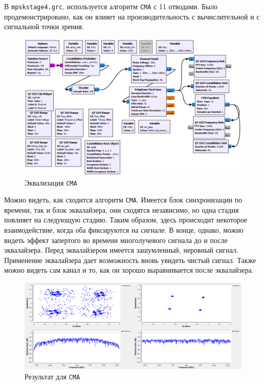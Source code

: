\documentclass[a4paper]{article}
\begin{document}
            В  \texttt{mpskstage4.grc}, используется алгоритм  \texttt{CMA} с 11 отводами. Было продемонстрировано, как он влияет на производительность с вычислительной и с сигнальной точки зрения.
            
            \begin{figure}[H]
                \centering
                \includegraphics[width=\textwidth]{ex_6_1.png}
                \caption{Эквализация \texttt{CMA}}
                \label{fig:ex_6_1}
            \end{figure}
            
            Можно видеть, как сходится алгоритм \texttt{CMA}. Имеется блок синхронизации по времени, так и блок эквалайзера, они сходятся независимо, но одна стадия повлияет на следующую стадию. Таким образом, здесь происходит некоторое взаимодействие, когда оба фиксируются на сигнале. В конце, однако, можно видеть эффект запертого во времени многолучевого сигнала до и после эквалайзера. Перед эквалайзером имеется зашумленный, неровный сигнал. Применение эквалайзера дает возможность вновь увидеть чистый сигнал. Также можно видеть сам канал и то, как он хорошо выравнивается после эквалайзера.
            
            \begin{figure}[H]
                \centering
                \includegraphics[width=\textwidth]{ex_6_2.png}
                \caption{Результат для \texttt{CMA}}
                \label{fig:ex_6_2}
            \end{figure}
            
\end{document}
